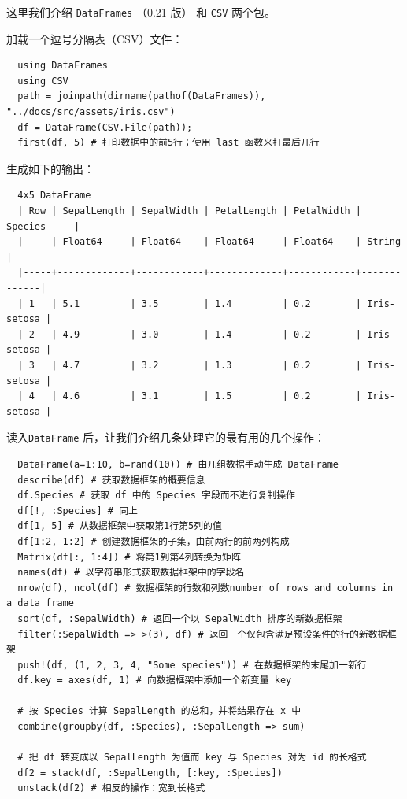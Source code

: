 \documentclass[10pt,a4paper]{article}
\begin{document}
这里我们介绍 \lstinline|DataFrames| （0.21 版） 和 \lstinline|CSV| 两个包。

加载一个逗号分隔表（CSV）文件：
\begin{lstlisting}
  using DataFrames
  using CSV
  path = joinpath(dirname(pathof(DataFrames)), "../docs/src/assets/iris.csv")
  df = DataFrame(CSV.File(path));
  first(df, 5) # 打印数据中的前5行；使用 last 函数来打最后几行
\end{lstlisting}

生成如下的输出：
\begin{lstlisting}
  4x5 DataFrame
  | Row | SepalLength | SepalWidth | PetalLength | PetalWidth | Species     |
  |     | Float64     | Float64    | Float64     | Float64    | String      |
  |-----+-------------+------------+-------------+------------+-------------|
  | 1   | 5.1         | 3.5        | 1.4         | 0.2        | Iris-setosa |
  | 2   | 4.9         | 3.0        | 1.4         | 0.2        | Iris-setosa |
  | 3   | 4.7         | 3.2        | 1.3         | 0.2        | Iris-setosa |
  | 4   | 4.6         | 3.1        | 1.5         | 0.2        | Iris-setosa |
\end{lstlisting}

读入\lstinline|DataFrame| 后，让我们介绍几条处理它的最有用的几个操作：
\begin{lstlisting}
  DataFrame(a=1:10, b=rand(10)) # 由几组数据手动生成 DataFrame
  describe(df) # 获取数据框架的概要信息
  df.Species # 获取 df 中的 Species 字段而不进行复制操作
  df[!, :Species] # 同上
  df[1, 5] # 从数据框架中获取第1行第5列的值
  df[1:2, 1:2] # 创建数据框架的子集，由前两行的前两列构成
  Matrix(df[:, 1:4]) # 将第1到第4列转换为矩阵
  names(df) # 以字符串形式获取数据框架中的字段名
  nrow(df), ncol(df) # 数据框架的行数和列数number of rows and columns in a data frame
  sort(df, :SepalWidth) # 返回一个以 SepalWidth 排序的新数据框架
  filter(:SepalWidth => >(3), df) # 返回一个仅包含满足预设条件的行的新数据框架
  push!(df, (1, 2, 3, 4, "Some species")) # 在数据框架的末尾加一新行
  df.key = axes(df, 1) # 向数据框架中添加一个新变量 key

  # 按 Species 计算 SepalLength 的总和，并将结果存在 x 中
  combine(groupby(df, :Species), :SepalLength => sum)

  # 把 df 转变成以 SepalLength 为值而 key 与 Species 对为 id 的长格式
  df2 = stack(df, :SepalLength, [:key, :Species])
  unstack(df2) # 相反的操作：宽到长格式
\end{lstlisting}
\end{document}
